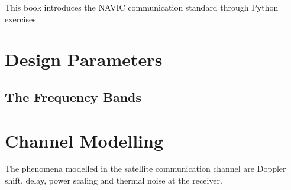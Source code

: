 \documentclass[11pt]{book}
\begin{document}

\setcounter{page}{1}

\begin{introduction}
This book introduces the NAVIC communication standard through Python exercises

\end{introduction}

\mainmatter
\chapter{Design Parameters}
\section{The Frequency Bands}

\chapter{Channel Modelling}
The phenomena modelled in the satellite communication channel are Doppler shift, delay, power scaling and thermal noise at the receiver.
\end{document}
